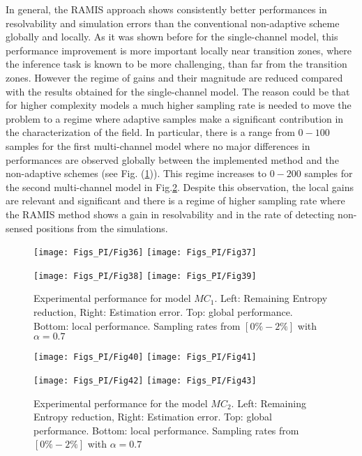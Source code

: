 In general, the RAMIS approach shows consistently better performances in resolvability and simulation errors than the conventional non-adaptive scheme globally and locally.  As it was shown before for the single-channel model, this performance improvement  is more important locally near transition zones, where the inference task is known to be more challenging, than far from the transition zones.  However the regime of gains and their magnitude are reduced compared with the results obtained for the single-channel model. The reason could be that for higher complexity models a much higher sampling rate is needed to move the problem to a regime where adaptive samples make a significant contribution in the characterization of the field. In particular,  there is a range from $0-100$ samples for the first multi-channel model where no major differences in performances are observed globally between the implemented method and the non-adaptive schemes (see Fig. (\ref{fig:PerfModel2_PI})). This regime increases to $0-200$ samples for the second multi-channel model in Fig.\ref{fig:PerfModel3_PI}. Despite this observation,  the local gains are relevant and significant and there is a regime of higher sampling rate where the RAMIS method shows a gain in resolvability and in the rate of detecting non-sensed positions from the simulations.

\begin{figure}[!ht]
    \centering
    \texttt{[image: Figs\_PI/Fig36]}
    \texttt{[image: Figs\_PI/Fig37]}

    \texttt{[image: Figs\_PI/Fig38]}
    \texttt{[image: Figs\_PI/Fig39]}
	\caption[Experimental performance for model $MC_1$.]{\label{fig:PerfModel2_PI} Experimental performance for model $MC_1$. Left: Remaining Entropy reduction, Right: Estimation error. Top: global performance. Bottom: local performance. Sampling rates from $[0\% - 2\%]$ with $\alpha = 0.7$}
\end{figure}

\begin{figure}[!ht]
    \centering
    \texttt{[image: Figs\_PI/Fig40]}
    \texttt{[image: Figs\_PI/Fig41]}

    \texttt{[image: Figs\_PI/Fig42]}
    \texttt{[image: Figs\_PI/Fig43]}
	\caption[Experimental performance for the model $MC_2$.]{\label{fig:PerfModel3_PI} Experimental performance for the model $MC_2$. Left: Remaining Entropy reduction, Right: Estimation error. Top: global performance. Bottom: local performance. Sampling rates from $[0\% - 2\%]$ with $\alpha = 0.7$}
\end{figure}
 	
